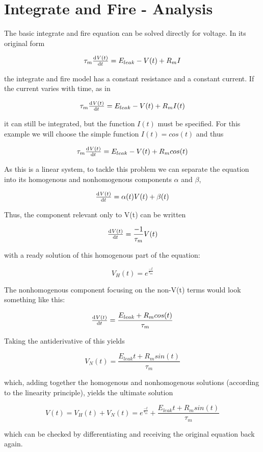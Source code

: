 \documentclass[12pt]{article}
\begin{document}
\maketitle

\section{Integrate and Fire - Analysis}

The basic integrate and fire equation can be solved directly for voltage.  In its original form

$$ \tau_m\od{V(t)}{t}=E_{leak}-V(t)+R_mI $$

the integrate and fire model has a constant resistance and a constant current.  If the current varies with time, as in

$$ \tau_m\od{V(t)}{t}=E_{leak}-V(t)+R_mI(t) $$

it can still be integrated, but the function $I(t)$ must be specified.  For this example we will choose the simple function $I(t)=cos(t)$ and thus

$$ \tau_m\od{V(t)}{t}=E_{leak}-V(t)+R_mcos(t) $$

As this is a linear system, to tackle this problem we can separate the equation into its homogenous and nonhomogenous components $\alpha$ and $\beta$, 

$$ \od{V(t)}{t}=\alpha(t)V(t)+\beta(t) $$

Thus, the component relevant only to V(t) can be written

$$ \od{V(t)}{t}=\frac{-1}{\tau_m}V(t) $$

with a ready solution of this homogenous part of the equation:

$$ V_H(t)=e^{\frac{-t}{ \tau_m}} $$

The nonhomogenous component focusing on the non-V(t) terms would look something like this:

$$ \od{V(t)}{t}=\frac{E_{leak}+R_mcos(t)}{\tau_m} $$

Taking the antiderivative of this yields

$$ V_N(t)=\frac{E_{leak}t+R_msin(t)}{\tau_m} $$

which, adding together the homogenous and nonhomogenous solutions (according to the linearity principle), yields the ultimate solution

$$ V(t)=V_H(t)+V_N(t)=e^{\frac{-t}{\tau_m}}+\frac{E_{leak}t+R_msin(t)}{\tau_m} $$

which can be checked by differentiating and receiving the original equation back again.
\end{document}
